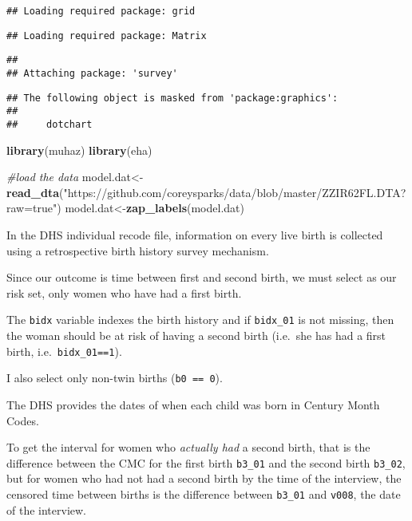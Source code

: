 \documentclass[
]{article}
\newenvironment{Shaded}{\begin{snugshade}}{\end{snugshade}}
\newcommand{\CommentTok}[1]{\textcolor[rgb]{0.56,0.35,0.01}{\textit{#1}}}
\newcommand{\KeywordTok}[1]{\textcolor[rgb]{0.13,0.29,0.53}{\textbf{#1}}}
\newcommand{\NormalTok}[1]{#1}
\newcommand{\StringTok}[1]{\textcolor[rgb]{0.31,0.60,0.02}{#1}}
\begin{document}
\begin{verbatim}
## Loading required package: grid
\end{verbatim}

\begin{verbatim}
## Loading required package: Matrix
\end{verbatim}

\begin{verbatim}
## 
## Attaching package: 'survey'
\end{verbatim}

\begin{verbatim}
## The following object is masked from 'package:graphics':
## 
##     dotchart
\end{verbatim}

\begin{Shaded}
\begin{Highlighting}[]
\KeywordTok{library}\NormalTok{(muhaz)}
\KeywordTok{library}\NormalTok{(eha)}

\CommentTok{#load the data}
\NormalTok{model.dat<-}\KeywordTok{read_dta}\NormalTok{(}\StringTok{"https://github.com/coreysparks/data/blob/master/ZZIR62FL.DTA?raw=true"}\NormalTok{)}
\NormalTok{model.dat<-}\KeywordTok{zap_labels}\NormalTok{(model.dat)}
\end{Highlighting}
\end{Shaded}

In the DHS individual recode file, information on every live birth is
collected using a retrospective birth history survey mechanism.

Since our outcome is time between first and second birth, we must select
as our risk set, only women who have had a first birth.

The \texttt{bidx} variable indexes the birth history and if
\texttt{bidx\_01} is not missing, then the woman should be at risk of
having a second birth (i.e.~she has had a first birth,
i.e.~\texttt{bidx\_01==1}).

I also select only non-twin births (\texttt{b0\ ==\ 0}).

The DHS provides the dates of when each child was born in Century Month
Codes.

To get the interval for women who \emph{actually had} a second birth,
that is the difference between the CMC for the first birth
\texttt{b3\_01} and the second birth \texttt{b3\_02}, but for women who
had not had a second birth by the time of the interview, the censored
time between births is the difference between \texttt{b3\_01} and
\texttt{v008}, the date of the interview.
\end{document}
